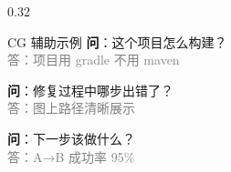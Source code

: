 \documentclass[aspectratio=169,10pt]{beamer}
\begin{document}
\begin{frame}
\begin{columns}[T]
    \begin{column}{0.32\textwidth}
      \begin{block}{CG 辅助示例}
        \textbf{问}：这个项目怎么构建？\\
        \textcolor{gray}{答：项目用 gradle 不用 maven}

        \vspace{0.2cm}

        \textbf{问}：修复过程中哪步出错了？\\
        \textcolor{gray}{答：图上路径清晰展示}

        \vspace{0.2cm}

        \textbf{问}：下一步该做什么？\\
        \textcolor{gray}{答：A→B 成功率 95\%}
      \end{block}
    \end{column}
  \end{columns}
\end{frame}
\end{document}

